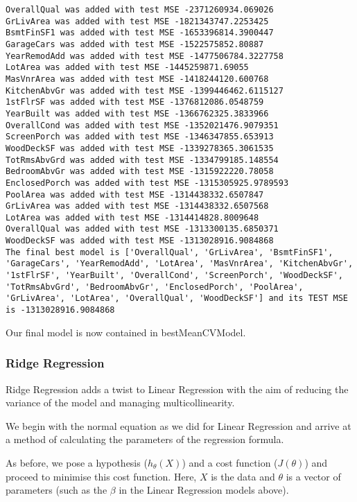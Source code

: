 \documentclass[11pt]{article}
\begin{document}
    \begin{Verbatim}[commandchars=\\\{\}]
OverallQual was added with test MSE -2371260934.069026
GrLivArea was added with test MSE -1821343747.2253425
BsmtFinSF1 was added with test MSE -1653396814.3900447
GarageCars was added with test MSE -1522575852.80887
YearRemodAdd was added with test MSE -1477506784.3227758
LotArea was added with test MSE -1445259871.69055
MasVnrArea was added with test MSE -1418244120.600768
KitchenAbvGr was added with test MSE -1399446462.6115127
1stFlrSF was added with test MSE -1376812086.0548759
YearBuilt was added with test MSE -1366762325.3833966
OverallCond was added with test MSE -1352021476.9079351
ScreenPorch was added with test MSE -1346347855.653913
WoodDeckSF was added with test MSE -1339278365.3061535
TotRmsAbvGrd was added with test MSE -1334799185.148554
BedroomAbvGr was added with test MSE -1315922220.78058
EnclosedPorch was added with test MSE -1315305925.9789593
PoolArea was added with test MSE -1314438332.6507847
GrLivArea was added with test MSE -1314438332.6507568
LotArea was added with test MSE -1314414828.8009648
OverallQual was added with test MSE -1313300135.6850371
WoodDeckSF was added with test MSE -1313028916.9084868
The final best model is ['OverallQual', 'GrLivArea', 'BsmtFinSF1', 'GarageCars', 'YearRemodAdd', 'LotArea', 'MasVnrArea', 'KitchenAbvGr', '1stFlrSF', 'YearBuilt', 'OverallCond', 'ScreenPorch', 'WoodDeckSF', 'TotRmsAbvGrd', 'BedroomAbvGr', 'EnclosedPorch', 'PoolArea', 'GrLivArea', 'LotArea', 'OverallQual', 'WoodDeckSF'] and its TEST MSE is -1313028916.9084868

    \end{Verbatim}

    Our final model is now contained in bestMeanCVModel.

    \hypertarget{ridge-regression}{%
\subsubsection{Ridge Regression}\label{ridge-regression}}

Ridge Regression adds a twist to Linear Regression with the aim of
reducing the variance of the model and managing multicollinearity.

We begin with the normal equation as we did for Linear Regression and
arrive at a method of calculating the parameters of the regression
formula.

    As before, we pose a hypothesis (\(h_{\theta}(X)\)) and a cost function
(\(J(\theta)\)) and proceed to minimise this cost function. Here, \(X\)
is the data and \(\theta\) is a vector of parameters (such as the
\(\beta\) in the Linear Regression models above).
\end{document}
